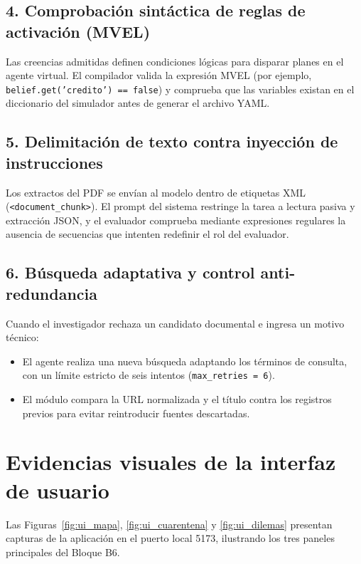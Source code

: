 \documentclass[11pt,a4paper]{article}
\begin{document}
\subsection{4. Comprobación sintáctica de reglas de activación (MVEL)}
Las creencias admitidas definen condiciones lógicas para disparar planes en el agente virtual. El compilador valida la expresión MVEL (por ejemplo, \texttt{belief.get('credito') == false}) y comprueba que las variables existan en el diccionario del simulador antes de generar el archivo YAML.

\subsection{5. Delimitación de texto contra inyección de instrucciones}
Los extractos del PDF se envían al modelo dentro de etiquetas XML (\texttt{<document\_chunk>}). El prompt del sistema restringe la tarea a lectura pasiva y extracción JSON, y el evaluador comprueba mediante expresiones regulares la ausencia de secuencias que intenten redefinir el rol del evaluador.

\subsection{6. Búsqueda adaptativa y control anti-redundancia}
Cuando el investigador rechaza un candidato documental e ingresa un motivo técnico:
\begin{itemize}[leftmargin=*]
    \item El agente realiza una nueva búsqueda adaptando los términos de consulta, con un límite estricto de seis intentos (\texttt{max\_retries = 6}).
    \item El módulo compara la URL normalizada y el título contra los registros previos para evitar reintroducir fuentes descartadas.
\end{itemize}

\section{Evidencias visuales de la interfaz de usuario}

Las Figuras~\ref{fig:ui_mapa}, \ref{fig:ui_cuarentena} y \ref{fig:ui_dilemas} presentan capturas de la aplicación en el puerto local 5173, ilustrando los tres paneles principales del Bloque B6.
\end{document}
